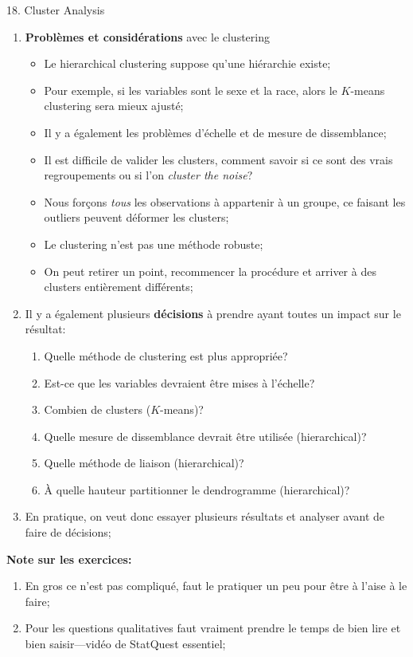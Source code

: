 \documentclass[12pt, titlepage, french]{report}
\begin{document}
\begin{CHPT_SUMM}[label = {CLUSTERS}]{18. Cluster Analysis}
\begin{enumerate}
	\texttt{[image: src/ISLR-HIERARCH-SCALE.png]}
	\item	\textbf{Problèmes et considérations} avec le clustering
		\begin{itemize}
		\item	Le hierarchical clustering suppose qu'une hiérarchie existe;
		\item[]	Pour exemple, si les variables sont le sexe et la race, alors le $K$-means clustering sera mieux ajusté;
		\item	Il y a également les problèmes d'échelle et de mesure de dissemblance;
		\item	Il est difficile de valider les clusters, comment savoir si ce sont des vrais regroupements ou si l'on \textit{cluster the noise}?
		\item	Nous forçons \textit{tous} les observations à appartenir à un groupe, ce faisant les outliers peuvent déformer les clusters;
		\item	Le clustering n'est pas une méthode robuste;
		\item[]	On peut retirer un point, recommencer la procédure et arriver à des clusters entièrement différents;
		\end{itemize}
%		
	\item[]	Il y a également plusieurs \textbf{décisions} à prendre ayant toutes un impact sur le résultat:
		\begin{enumerate}[label = \roman*.]
		\item	Quelle méthode de clustering est plus appropriée?
		\item	Est-ce que les variables devraient être mises à l'échelle?
		\item	Combien de clusters ($K$-means)?
		\item	Quelle mesure de dissemblance devrait être utilisée (hierarchical)?
		\item	Quelle méthode de liaison (hierarchical)?
		\item	À quelle hauteur partitionner le dendrogramme (hierarchical)?
		\end{enumerate}
	\item[]	En pratique, on veut donc essayer plusieurs résultats et analyser avant de faire de décisions;
\end{enumerate}
\textbf{Note sur les exercices:} 
\begin{enumerate}
	\item	En gros ce n'est pas compliqué, faut le pratiquer un peu pour être à l'aise à le faire;
	\item	Pour les questions qualitatives faut vraiment prendre le temps de bien lire et bien saisir---vidéo de StatQuest essentiel;

\end{enumerate}
\end{CHPT_SUMM}
\end{document}
